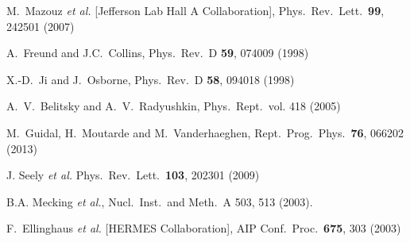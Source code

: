 \documentclass[nofootinbib,twocolumn,showpacs,prl,superscriptaddress,secnumarabic,amssymb,nobibnotes,aps,floatfix]{revtex4}
\begin{document}
\begin{thebibliography}{99}
  M.~Mazouz {\it et al.} [Jefferson Lab Hall A Collaboration],
   Phys.\ Rev.\ Lett.\  {\bf 99}, 242501 (2007)

A.~Freund and J.C.~Collins, Phys.\ Rev.\ D {\bf 59}, 074009 (1998)

   X.-D.~Ji and J.~Osborne, Phys.\ Rev.\ D {\bf 58}, 094018 (1998)

A.~V.~Belitsky and A.~V.~Radyushkin, Phys.\ Rept.\ vol. 418 (2005)

 M.~Guidal, H.~Moutarde and M.~Vanderhaeghen,
 Rept.\ Prog.\ Phys.\  {\bf 76}, 066202 (2013)

 J. Seely {\it et al.} Phys.\ Rev.\ Lett.\ {\bf 103}, 202301 (2009)

   B.A. Mecking {\it et al.}, Nucl.\ Inst.\ and Meth.\ A 503, 513 (2003).

 F.~Ellinghaus {\it et al.} [HERMES Collaboration],
  AIP Conf.\ Proc.\  {\bf 675}, 303 (2003)

\end{thebibliography}
\end{document}
